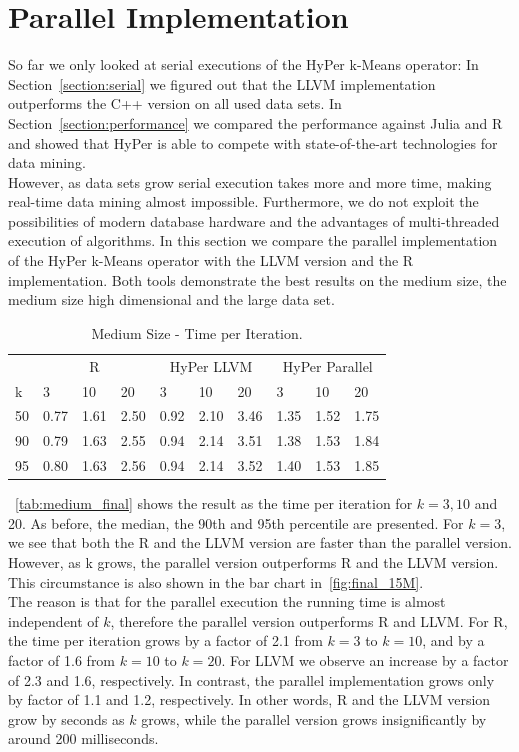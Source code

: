 \section{Parallel Implementation}


So far we only looked at serial executions of the HyPer k-Means operator: In Section~\ref{section:serial}  we figured out that the LLVM implementation outperforms the C++ version on all used data sets. In Section~\ref{section:performance} we compared the performance against Julia and R and showed that HyPer is able to compete with state-of-the-art technologies for data mining.
\\
However, as data sets grow serial execution takes more and more time, making real-time data mining almost impossible. Furthermore, we do not exploit the possibilities of modern database hardware and the advantages of multi-threaded execution of algorithms. In this section we compare the parallel implementation of the HyPer k-Means operator with the LLVM version and the R implementation. Both tools demonstrate the best results on the medium size, the medium size high dimensional and the large data set. 

\begin{table}[htsb]
  \caption[Medium Size - Time per Iteration]{Medium Size - Time per Iteration.}
  \label{tab:medium_final}
  \centering
  \begin{tabular}{l l l l l l l l l l }
    \toprule
      & \multicolumn{3}{c}{R} & \multicolumn{3}{c}{HyPer LLVM} & \multicolumn{3}{c}{HyPer Parallel}  \\
      k & 3 & 10 & 20 & 3 & 10 & 20 & 3 & 10 & 20 \\
    \midrule
      50  & 0.77 & 1.61 & 2.50 & 0.92 & 2.10 & 3.46 & 1.35 & 1.52 & 1.75 \\
      90  & 0.79 & 1.63 & 2.55 & 0.94 & 2.14 & 3.51 & 1.38 & 1.53 & 1.84 \\
      95  & 0.80 & 1.63 & 2.56 & 0.94 & 2.14 & 3.52 & 1.40 & 1.53 & 1.85 \\
    \bottomrule
  \end{tabular}
\end{table}

~\autoref{tab:medium_final} shows the result as the time per iteration for $k = 3, 10$ and 20. As before, the median, the 90th and 95th percentile are presented. For $k = 3$, we see that both the R and the LLVM version are faster than the parallel version. However, as k grows, the parallel version outperforms R and the LLVM version. This circumstance is also shown in the bar chart in~\autoref{fig:final_15M}.
\\
The reason is that for the parallel execution the running time is almost independent of $k$, therefore the parallel version outperforms R and LLVM. For R, the time per iteration grows by a factor of 2.1 from $k = 3$ to $k = 10$, and by a factor of 1.6 from $k = 10$ to $k = 20$. For LLVM we observe an increase by a factor of 2.3 and 1.6, respectively. In contrast, the parallel implementation grows only by factor of 1.1 and 1.2, respectively. In other words, R and the LLVM version grow by seconds as $k$ grows, while the parallel version grows insignificantly by around 200 milliseconds. 

